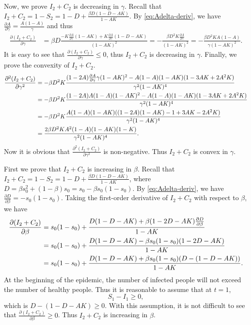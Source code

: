 \documentclass[nonblindrev, copyedit]{informs3a}
\newcommand\nc[1]{\textcolor{red}{NC: #1}}
\newcounter{prop}[chapter]
\begin{document}
Now, we prove $I_2+C_2$ is decreasing in $\gamma$. Recall that $I_2+C_2=1-S_2=1-D+\frac{\beta D(1-D-AK)}{1-AK}$. By \eqref{eq:Adelta-deriv}, we have $\frac{\partial A}{\partial\gamma}=\frac{A(1-A)}{\gamma}$ and thus
\begin{align*}%
    \frac{\partial (I_2+C_2)}{\partial \gamma}&=\beta D\frac{-K\frac{\partial A}{\partial\gamma}(1-AK)+K\frac{\partial A}{\partial\gamma}(1-D-AK)}{(1-AK)^2}=-\frac{\beta D^2K\frac{\partial A}{\partial\gamma}}{(1-AK)^2}=-\frac{\beta D^2KA(1-A)}{\gamma(1-AK)^2}.
\end{align*}
It is easy to see that $\frac{\partial (I_2+C_2)}{\partial \gamma}\le 0$, thus $I_2+C_2$ is decreasing in $\gamma$.
Finally, we prove the convexity of $I_2+C_2$.
\begin{align*}
    \frac{\partial^2 (I_2+C_2)}{\partial \gamma^2}&=-\beta D^2K\frac{(1-2A)\frac{\partial A}{\partial\gamma}\gamma(1-AK)^2-A(1-A)(1-AK)(1-3AK+2A^2K)}{\gamma^2(1-AK)^4}\notag\\
    &=-\beta D^2K\frac{(1-2A)A(1-A)(1-AK)^2-A(1-A)(1-AK)(1-3AK+2A^2K)}{\gamma^2(1-AK)^4}\notag\\
    &=-\beta D^2K\frac{A(1-A)(1-AK)((1-2A)(1-AK)-1+3AK-2A^2K)}{\gamma^2(1-AK)^4}\\
    &=\frac{2\beta D^2KA^2(1-A)(1-AK)(1-K)}{\gamma^2(1-AK)^4}.
\end{align*}
Now it is obvious that $\frac{\partial^2 (I_2+C_2)}{\partial \gamma^2}$ is non-negative. Thus $I_2+C_2$ is convex in $\gamma$.\Halmos
\endproof


First we prove that $I_2+C_2$ is increasing in $\beta$. Recall that $I_2+C_2=1-S_2=1-D+\frac{\beta D(1-D-AK)}{1-AK}$, where $D=\beta s_0^2+(1-\beta)s_0=s_0-\beta s_0(1-s_0)$. By \eqref{eq:Adelta-deriv}, we have $\frac{\partial D}{\partial\beta}=-s_0(1-s_0)$. Taking the first-order derivative of $I_2+C_2$ with respect to $\beta$, we have
\begin{align*}
    \frac{\partial (I_2+C_2)}{\partial \beta}&=s_0(1-s_0)+\frac{D(1-D-AK)+\beta(1-2D-AK)\frac{\partial D}{\partial\beta}}{1-AK}\notag\\
    &=s_0(1-s_0)+\frac{D(1-D-AK)-\beta s_0(1-s_0)(1-2D-AK)}{1-AK}\notag\\
    &=s_0(1-s_0)+\frac{D(1-D-AK)+\beta s_0(1-s_0)(D-(1-D-AK))}{1-AK}.
\end{align*}
At the beginning of the epidemic, the number of infected people will not exceed the number of healthy people. Thus it is reasonable to assume that at $t=1$,
\begin{equation}\label{eq:s1i1-relation}
    S_1-I_1\ge0,
\end{equation}
which is $D-(1-D-AK)\ge0$. With this assumption, it is not difficult to see that $\frac{\partial (I_2+C_2)}{\partial \beta}\ge0$. Thus $I_2+C_2$ is increasing in $\beta$.
\end{document}
